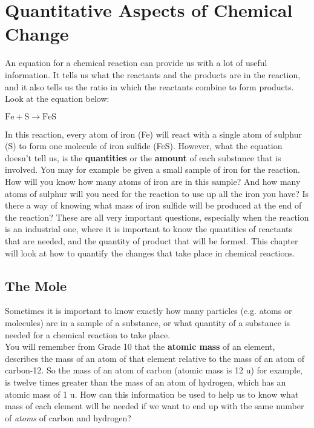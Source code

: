 \chapter{Quantitative Aspects of Chemical Change}
\label{chap:quant}

An equation for a chemical reaction can provide us with a lot of useful information. It tells us what the reactants and the products are in the reaction, and it also tells us the ratio in which the reactants combine to form products. Look at the equation below:

\begin{center}
${\text{Fe} + \text{S} \rightarrow \text{FeS}}$\\
\end{center}

In this reaction, every atom of iron (Fe) will react with a single atom of sulphur (S) to form one molecule of iron sulfide (FeS). However, what the equation doesn't tell us, is the \textbf{quantities} or the \textbf{amount} of each substance that is involved. You may for example be given a small sample of iron for the reaction. How will you know how many atoms of iron are in this sample? And how many atoms of sulphur will you need for the reaction to use up all the iron you have? Is there a way of knowing what mass of iron sulfide will be produced at the end of the reaction? These are all very important questions, especially when the reaction is an industrial one, where it is important to know the quantities of reactants that are needed, and the quantity of product that will be formed. This chapter will look at how to quantify the changes that take place in chemical reactions.




\section{The Mole}
\label{sec:quant:mole}

Sometimes it is important to know exactly how many particles (e.g. atoms or molecules) are in a sample of a substance, or what quantity of a substance is needed for a chemical reaction to take place.\\

You will remember from Grade 10 that the \textbf{atomic mass} of an element, describes the mass of an atom of that element relative to the mass of an atom of carbon-12. So the mass of an atom of carbon (atomic mass is 12 u) for example, is twelve times greater than the mass of an atom of hydrogen, which has an atomic mass of 1 u. How can this information be used to help us to know what mass of each element will be needed if we want to end up with the same number of \textit{atoms} of carbon and hydrogen?\\

